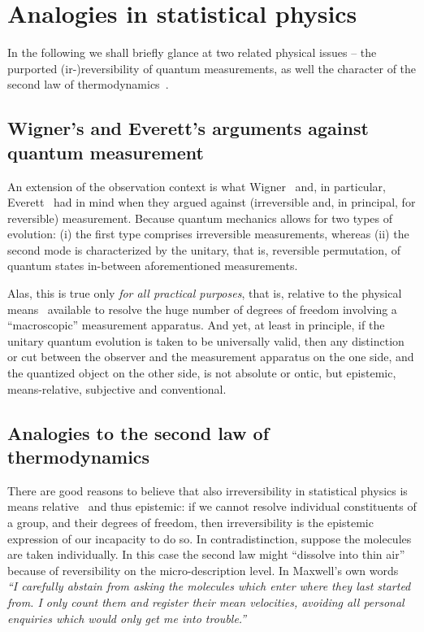 \documentclass{llncs}
\begin{document}




\section{Analogies in statistical physics}

In the following we shall briefly glance at two related physical issues
--
the purported (ir-)reversibility
of quantum measurements,
as well the character of the second law of thermodynamics~\cite{Myrvold2011237}.

\subsection{Wigner's and Everett's arguments against quantum measurement}

An extension of the observation context is what Wigner~\cite{wigner:mb}
and, in particular, Everett~\cite{everett,everett-collw} had in mind when they argued against (irreversible
and, in principal, for reversible) measurement.
Because quantum mechanics allows for two types of evolution:
(i) the first type comprises irreversible measurements,
whereas (ii) the second mode is characterized by the unitary, that is, reversible permutation, of quantum states
in-between aforementioned measurements.

Alas, this is true only
{\em for all practical purposes},
that is, {relative to the physical means}~\cite{Myrvold2011237} available to resolve the huge number of degrees of freedom involving a
``macroscopic'' measurement apparatus.
And yet, at least in principle, if the unitary quantum evolution is taken to be universally valid,
then any distinction or cut between the observer and the measurement apparatus on the one side,
and the quantized object on the other side, is not absolute or ontic,
but epistemic, means-relative, subjective and conventional.


\subsection{Analogies to the second law of thermodynamics}

There are good reasons to believe that also irreversibility in statistical physics
is means relative~\cite{Myrvold2011237} and thus epistemic: if we cannot resolve individual constituents of a group, and their  degrees of freedom,
then irreversibility is the epistemic expression of our incapacity to do so.
In contradistinction, suppose the molecules are taken individually.
In this case the second law might ``dissolve into thin air'' because of reversibility on the micro-description level.
In Maxwell's own words~\cite[Document~15, p.~422]{garber}
{\em ``I carefully abstain from asking the molecules which enter where they last started
from. I only count them and register their mean velocities, avoiding all personal
enquiries which would only get me into trouble.''}
\end{document}
